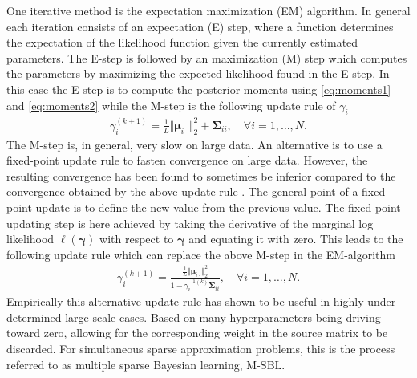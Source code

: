 One iterative method is the expectation maximization (EM) algorithm.
In general each iteration consists of an expectation (E) step, where a function determines the expectation of the likelihood function given the currently estimated parameters. 
The E-step is followed by an maximization (M) step which computes the parameters by maximizing the expected likelihood found in the E-step.
In this case the E-step is to compute the posterior moments using \eqref{eq:moments1} and \eqref{eq:moments2} while the M-step is the following update rule of $\gamma_i$ \cite[p. 147]{phd_wipf}
\begin{align*}
\gamma_i^{(k+1)} = \frac{1}{L} \Vert \boldsymbol{\mu}_{i \cdot} \Vert_2^2 + \boldsymbol{\Sigma}_{ii}, \quad \forall i = 1, \dots, N.
\end{align*}
The M-step is, in general, very slow on large data. 
An alternative is to use a fixed-point update rule to fasten convergence on large data. 
However, the resulting convergence has been found to sometimes be inferior compared to the convergence obtained by the above update rule \cite[p.147]{phd_wipf}. 
The general point of a fixed-point update is to define the new value from the previous value. 
The fixed-point updating step is here achieved by taking the derivative of the marginal log likelihood $\ell(\boldsymbol{\gamma})$ with respect to $\boldsymbol{\gamma}$ and equating it with zero. 
This leads to the following update rule which can replace the above M-step in the EM-algorithm \cite[p. 147]{phd_wipf}
\begin{align}
\gamma_i^{(k+1)} = \frac{\frac{1}{L} \Vert \boldsymbol{\mu}_{i \cdot} \Vert_2^2}{1 - \gamma_i^{-1 (k)} \boldsymbol{\Sigma}_{ii}}, \quad \forall i = 1, \dots, N.
\end{align}
Empirically this alternative update rule has shown to be useful in highly under-determined large-scale cases. 
Based on many hyperparameters being driving toward zero, allowing for the corresponding weight in the source matrix to be discarded. 
For simultaneous sparse approximation problems, this is the process referred to as multiple sparse Bayesian learning, M-SBL.

